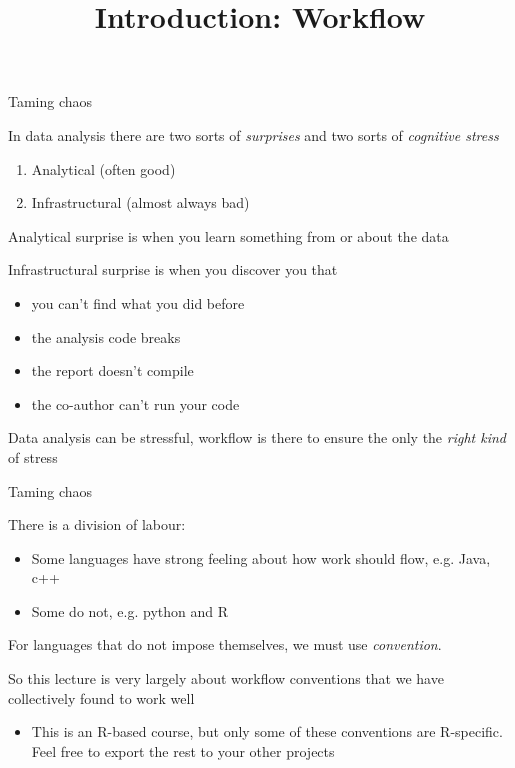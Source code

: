 \documentclass{hertieteaching}
\title{Introduction: Workflow}
\begin{document}
\maketitle

\begin{frame}{Taming chaos}

In data analysis there are two sorts of \textit{surprises} and two sorts of \textit{cognitive stress}
\begin{enumerate}
  \item Analytical (often good)
  \item Infrastructural (almost always bad)
\end{enumerate}
Analytical surprise is when you learn something from or about the data 

Infrastructural surprise is when you discover you that 
\begin{itemize}
  \item you can't find what you did before
  \item the analysis code breaks
  \item the report doesn't compile
  \item the co-author can't run your code
\end{itemize}

Data analysis can be stressful, workflow is there to ensure the only the \textit{right kind} of stress

\end{frame}

\begin{frame}{Taming chaos}
  
There is a division of labour:
\begin{itemize}
  \item Some languages have strong feeling about how work should flow, e.g. \textsf{Java}, \textsf{c++}
  \item Some do not, e.g. \textsf{python} and \textsf{R}
\end{itemize}
For languages that do not impose themselves, we must use \textit{convention}.

So this lecture is very largely about workflow conventions that we have collectively found to work well 
\begin{itemize}
  \item This is an R-based course, but only some of these conventions are R-specific. Feel free to export the rest to your other projects
\end{itemize}


\end{frame}
\end{document}
